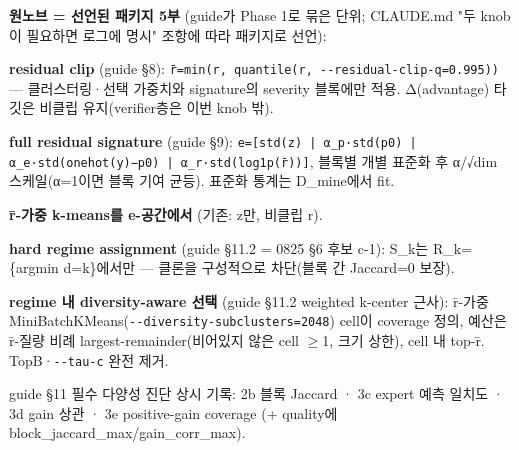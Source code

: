 \textbf{원노브 =\allowbreak{} 선언된 패키지 5부} (guide가 Phase 1로 묶은 단위; CLAUDE.md "두 knob이 필요하면 로그에 명시" 조항에 따라 패키지로 선언):

\par\noindent \textbullet\enspace \textbf{residual clip} (guide §8): \texttt{r̄=\allowbreak{}\allowbreak{}min(r\allowbreak{},\allowbreak{} quanti\allowbreak{}le(r,\allowbreak{} -\allowbreak{}-\allowbreak{}residual\allowbreak{}-\allowbreak{}clip-\allowbreak{}q=\allowbreak{}\allowbreak{}0.\allowbreak{}995))} — 클러스터링·선택 가중치와 signature의 severity 블록에만 적용. Δ(advantage) 타깃은 비클립 유지(verifier층은 이번 knob 밖).


\par\noindent \textbullet\enspace \textbf{full residual signature} (guide §9): \texttt{e=\allowbreak{}\allowbreak{}[std(z\allowbreak{}) | α\_\allowbreak{}\allowbreak{}p·\allowbreak{}std(p0) \allowbreak{}| α\_\allowbreak{}\allowbreak{}e·st\allowbreak{}d(onehot\allowbreak{}(y)−p0) \allowbreak{}| α\_\allowbreak{}\allowbreak{}r·st\allowbreak{}d(log1p(\allowbreak{}r̄))]}, 블록별 개별 표준화 후 α/\allowbreak{}√dim 스케일(α=\allowbreak{}1이면 블록 기여 균등). 표준화 통계는 D\_\allowbreak{}mine에서 fit.


\par\noindent \textbullet\enspace \textbf{r̄-가중 k-means를 e-공간에서} (기존: z만, 비클립 r).


\par\noindent \textbullet\enspace \textbf{hard regime assignment} (guide §11.2 =\allowbreak{} 0825 §6 후보 c-1): S\_\allowbreak{}k는 R\_\allowbreak{}k=\allowbreak{}\{argmin d=\allowbreak{}k\}에서만 — 클론을 구성적으로 차단(블록 간 Jaccard=\allowbreak{}0 보장).


\par\noindent \textbullet\enspace \textbf{regime 내 diversity-aware 선택} (guide §11.2 weighted k-center 근사): r̄-가중 MiniBatchKMeans(\texttt{-\allowbreak{}-\allowbreak{}divers\allowbreak{}ity-\allowbreak{}subc\allowbreak{}lusters=\allowbreak{}\allowbreak{}2048}) cell이 coverage 정의, 예산은 r̄-질량 비례 largest-remainder(비어있지 않은 cell \ensuremath{\geq}1, 크기 상한), cell 내 top-r̄. TopB·\texttt{-\allowbreak{}-\allowbreak{}tau-\allowbreak{}c} 완전 제거.


\par\noindent \textbullet\enspace guide §11 필수 다양성 진단 상시 기록: 2b 블록 Jaccard · 3c expert 예측 일치도 · 3d gain 상관 · 3e positive-gain coverage (+\allowbreak{} quality에 block\_\allowbreak{}jaccard\_\allowbreak{}max/\allowbreak{}gain\_\allowbreak{}corr\_\allowbreak{}max).


